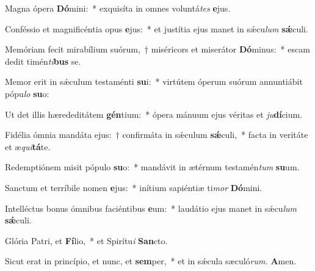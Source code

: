 \item Magna ópera \textbf{Dó}mini:~* exquisíta in omnes voluntá\tinyhspace\textit{tes} \textbf{e}jus.
\item Conféssio et magnificéntia opus \textbf{e}jus:~* et justítia ejus manet in sǽcu\tinyhspace\textit{lum} \textbf{sǽ}culi.
\item Memóriam fecit mirabílium suórum,~† miséricors et miserátor \textbf{Dó}minus:~* escam dedit timén\textit{ti}\textbf{bus} se.
\item Memor erit in sǽculum testaménti \textbf{su}i:~* virtútem óperum suórum annuntiábit pópu\tinyhspace\textit{lo} \textbf{su}o:
\item Ut det illis hærededitátem \textbf{gén}tium:~* ópera mánuum ejus véritas et \textit{ju}\textbf{dí}cium.
\item Fidélia ómnia mandáta ejus:~† confirmáta in sǽculum \textbf{sǽ}culi,~* facta in veritáte et æ\tinyhspace\textit{qui}\textbf{tá}te.
\item Redemptiónem misit pópulo \textbf{su}o:~* mandávit in ætérnum testamén\tinyhspace\textit{tum} \textbf{su}um.
\item Sanctum et terríbile nomen \textbf{e}jus:~* inítium sapiéntiæ ti\textit{mor} \textbf{Dó}mini.
\item Intelléctus bonus ómnibus faciéntibus \textbf{e}um:~* laudátio ejus manet in sǽcu\tinyhspace\textit{lum} \textbf{sǽ}culi.
\item Glória Patri, et \textbf{Fí}lio,~* et Spirítu\textit{i} \textbf{San}cto.
\item Sicut erat in princípio, et nunc, et \textbf{sem}per,~* et in sǽcula sæculó\textit{rum.} \textbf{A}men.



